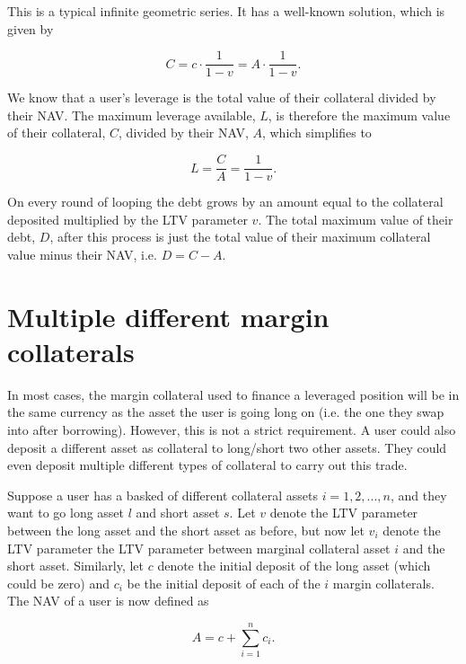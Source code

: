 \documentclass[bibliography=numbered]{article}
\begin{document}
This is a typical infinite geometric series. It has a well-known solution, which is given by 

\begin{equation}
    C 
    =
    c \cdot \frac{1}{1 - v}
    =
    A \cdot \frac{1}{1 - v}.
\end{equation}

We know that a user's leverage is the total value of their collateral divided by their NAV. The maximum leverage available, $L$, is therefore the maximum value of their collateral, $C$, divided by their NAV, $A$, which simplifies to

\begin{equation}
    L
    =
    \frac{C}{A}
    =
    \frac{1}{1 - v}.
\end{equation}

On every round of looping the debt grows by an amount equal to the collateral deposited multiplied by the LTV parameter $v$. The total maximum value of their debt, $D$, after this process is just the total value of their maximum collateral value minus their NAV, i.e. $D = C - A$. 

\section{Multiple different margin collaterals}

In most cases, the margin collateral used to finance a leveraged position will be in the same currency as the asset the user is going long on (i.e. the one they swap into after borrowing). However, this is not a strict requirement. A user could also deposit a different asset as collateral to long/short two other assets. They could even deposit multiple different types of collateral to carry out this trade. 

Suppose a user has a basked of different collateral assets $i = 1, 2, ..., n$, and they want to go long asset $l$ and short asset $s$. Let $v$ denote the LTV parameter between the long asset and the short asset as before, but now let $v_{i}$ denote the LTV parameter the LTV parameter between marginal collateral asset $i$ and the short asset. Similarly, let $c$ denote the initial deposit of the long asset (which could be zero) and $c_i$ be the initial deposit of each of the $i$ margin collaterals. The NAV of a user is now defined as

\begin{equation}
    A 
    = 
    c + \sum_{i = 1}^{n} c_i.
\end{equation}
\end{document}
